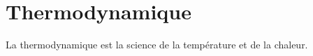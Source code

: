\section{Thermodynamique}
La thermodynamique est la science de la température et de la chaleur.

\subsection{}
\subsection{}

\subsection{}
\begin{center}
\end{center}

